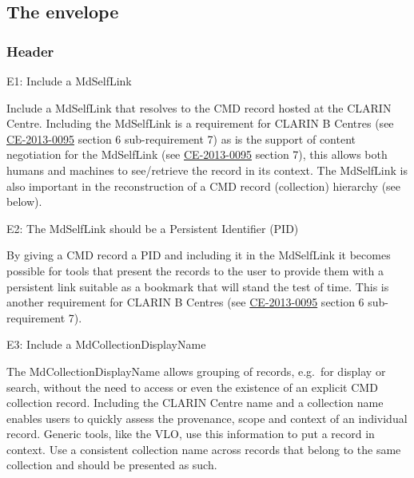 \subsection{The envelope}\label{the-envelope}

\subsubsection{Header}\label{header}

E1: Include a MdSelfLink

 

Include a MdSelfLink that resolves to the CMD record hosted at the CLARIN Centre. Including the MdSelfLink is a requirement for CLARIN B Centres (see
\href{http://hdl.handle.net/1839/00-DOCS.CLARIN.EU-78}{CE-2013-0095} section 6 sub-requirement 7) as is the support of content negotiation for the MdSelfLink (see
\href{http://hdl.handle.net/1839/00-DOCS.CLARIN.EU-78}{CE-2013-0095} section 7), this allows both humans and machines to see/retrieve the record in its context. The MdSelfLink is also important in the reconstruction of a CMD record (collection) hierarchy (see below).

\label{e2}
E2: The MdSelfLink should be a Persistent Identifier (PID)


By giving a CMD record a PID and including it in the MdSelfLink it becomes possible for tools that present the records to the user to provide them with a persistent link suitable as a bookmark that will stand the test of time. This is another requirement for CLARIN B Centres (see
\href{http://hdl.handle.net/1839/00-DOCS.CLARIN.EU-78}{CE-2013-0095} section 6 sub-requirement 7).

E3: Include a MdCollectionDisplayName

 

The MdCollectionDisplayName allows grouping of records, e.g.~for display or search, without the need to access or even the existence of an explicit CMD collection record. Including the CLARIN Centre name and a collection name enables users to quickly assess the provenance, scope and context of an individual record. Generic tools, like the VLO, use this information to put a record in context. Use a consistent collection name across records that belong to the same collection and should be presented as such.

